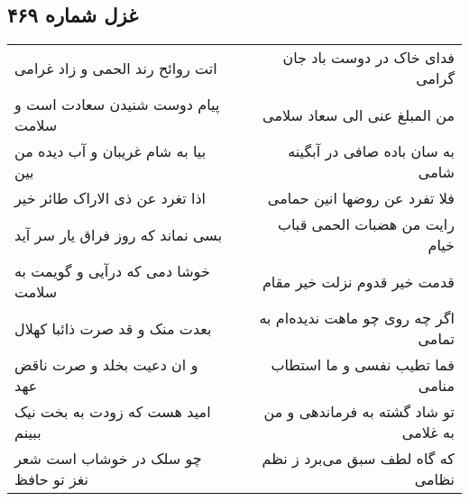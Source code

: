\begin{center}
\section*{غزل شماره ۴۶۹}
\label{sec:sh469}
\begin{longtable}{l p{0.5cm} r}
اتت روائح رند الحمی و زاد غرامی
&&
فدای خاک در دوست باد جان گرامی
\\
پیام دوست شنیدن سعادت است و سلامت
&&
من المبلغ عنی الی سعاد سلامی
\\
بیا به شام غریبان و آب دیده من بین
&&
به سان باده صافی در آبگینه شامی
\\
اذا تغرد عن ذی الاراک طائر خیر
&&
فلا تفرد عن روضها انین حمامی
\\
بسی نماند که روز فراق یار سر آید
&&
رایت من هضبات الحمی قباب خیام
\\
خوشا دمی که درآیی و گویمت به سلامت
&&
قدمت خیر قدوم نزلت خیر مقام
\\
بعدت منک و قد صرت ذائبا کهلال
&&
اگر چه روی چو ماهت ندیده‌ام به تمامی
\\
و ان دعیت بخلد و صرت ناقض عهد
&&
فما تطیب نفسی و ما استطاب منامی
\\
امید هست که زودت به بخت نیک ببینم
&&
تو شاد گشته به فرماندهی و من به غلامی
\\
چو سلک در خوشاب است شعر نغز تو حافظ
&&
که گاه لطف سبق می‌برد ز نظم نظامی
\\
\end{longtable}
\end{center}
